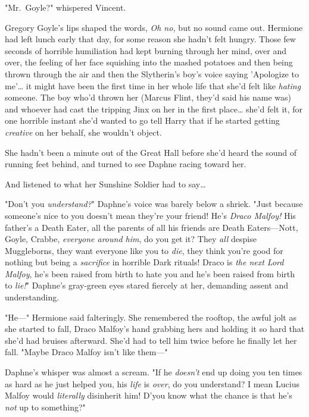 "Mr.~Goyle?" whispered Vincent.

Gregory Goyle's lips shaped the words, \emph{Oh no,} but no sound came out.
\sbreak
Hermione had left lunch early that day, for some reason she hadn't felt hungry. 
Those few seconds of horrible humiliation had kept burning through her mind, 
over and over, the feeling of her face squishing into the mashed potatoes and 
then being thrown through the air and then the Slytherin's boy's voice saying 
'Apologize to me'{\ldots} it might have been the first time in her whole life 
that she'd felt like \emph{hating} someone. The boy who'd thrown her (Marcus 
Flint, they'd said his name was) and whoever had cast the tripping Jinx on her 
in the first place{\ldots} she'd felt it, for one horrible instant she'd wanted 
to go tell Harry that if he started getting \emph{creative} on her behalf, she 
wouldn't object.

She hadn't been a minute out of the Great Hall before she'd heard the sound of 
running feet behind, and turned to see Daphne racing toward her.

And listened to what her Sunshine Soldier had to say{\ldots}

"Don't you \emph{understand?}" Daphne's voice was barely below a shriek. "Just 
because someone's nice to you doesn't mean they're your friend! He's 
\emph{Draco Malfoy!} His father's a Death Eater, all the parents of all his 
friends are Death Eaters---Nott, Goyle, Crabbe, \emph{everyone around him}, do 
you get it? They \emph{all} despise Muggleborns, they want everyone like you to 
\emph{die}, they think you're good for nothing but being a \emph{sacrifice} in 
horrible Dark rituals! Draco is \emph{the next Lord Malfoy}, he's been raised 
from birth to hate you and he's been raised from birth to \emph{lie!}" Daphne's 
gray-green eyes stared fiercely at her, demanding assent and understanding.

"He---" Hermione said falteringly. She remembered the rooftop, the awful jolt 
as she started to fall, Draco Malfoy's hand grabbing hers and holding it so 
hard that she'd had bruises afterward. She'd had to tell him twice before he 
finally let her fall. "Maybe Draco Malfoy isn't like them---"

Daphne's whisper was almost a scream. "If he \emph{doesn't} end up doing you 
ten times as hard as he just helped you, his \emph{life} is \emph{over}, do you 
understand? I mean Lucius Malfoy would \emph{literally} disinherit him! D'you 
know what the chance is that he's \emph{not} up to something?"

